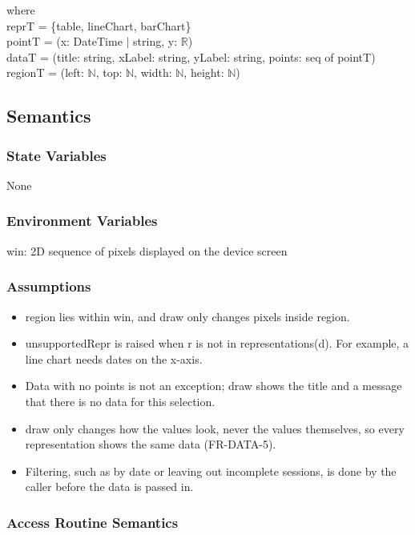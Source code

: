 \documentclass[12pt, titlepage]{article}
\begin{document}
\noindent where \\
reprT = \{table, lineChart, barChart\} \\
pointT = (x: DateTime $|$ string, y: $\mathbb{R}$) \\
dataT = (title: string, xLabel: string, yLabel: string, points: seq of pointT) \\
regionT = (left: $\mathbb{N}$, top: $\mathbb{N}$, width: $\mathbb{N}$, height:
$\mathbb{N}$)

\subsection{Semantics}

\subsubsection{State Variables}

None

\subsubsection{Environment Variables}

win: 2D sequence of pixels displayed on the device screen

\subsubsection{Assumptions}

\begin{itemize}
\item region lies within win, and draw only changes pixels inside region.
\item unsupportedRepr is raised when r is not in representations(d). For
  example, a line chart needs dates on the x-axis.
\item Data with no points is not an exception; draw shows the title and a
  message that there is no data for this selection.
\item draw only changes how the values look, never the values themselves, so
  every representation shows the same data (FR-DATA-5).
\item Filtering, such as by date or leaving out incomplete sessions, is done by
  the caller before the data is passed in.
\end{itemize}

\subsubsection{Access Routine Semantics}
\end{document}
